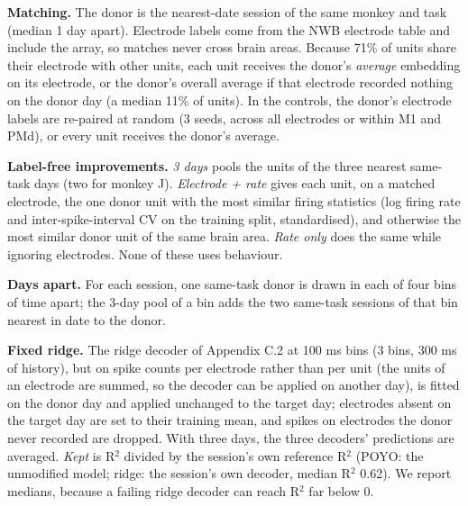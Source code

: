 \documentclass[11pt]{article}
\begin{document}
\textbf{Matching.} The donor is the nearest-date session of the same monkey and task (median 1 day apart). Electrode labels come from the NWB electrode table and include the array, so matches never cross brain areas. Because 71\% of units share their electrode with other units, each unit receives the donor's \emph{average} embedding on its electrode, or the donor's overall average if that electrode recorded nothing on the donor day (a median 11\% of units). In the controls, the donor's electrode labels are re-paired at random (3 seeds, across all electrodes or within M1 and PMd), or every unit receives the donor's average.

\textbf{Label-free improvements.} \emph{3 days} pools the units of the three nearest same-task days (two for monkey J). \emph{Electrode + rate} gives each unit, on a matched electrode, the one donor unit with the most similar firing statistics (log firing rate and inter-spike-interval CV on the training split, standardised), and otherwise the most similar donor unit of the same brain area. \emph{Rate only} does the same while ignoring electrodes. None of these uses behaviour.

\textbf{Days apart.} For each session, one same-task donor is drawn in each of four bins of time apart; the 3-day pool of a bin adds the two same-task sessions of that bin nearest in date to the donor.

\textbf{Fixed ridge.} The ridge decoder of Appendix C.2 at 100 ms bins (3 bins, 300 ms of history), but on spike counts per electrode rather than per unit (the units of an electrode are summed, so the decoder can be applied on another day), is fitted on the donor day and applied unchanged to the target day; electrodes absent on the target day are set to their training mean, and spikes on electrodes the donor never recorded are dropped. With three days, the three decoders' predictions are averaged. \emph{Kept} is R$^{2}$ divided by the session's own reference R$^{2}$ (POYO: the unmodified model; ridge: the session's own decoder, median R$^{2}$ 0.62). We report medians, because a failing ridge decoder can reach R$^{2}$ far below 0.
\end{document}
